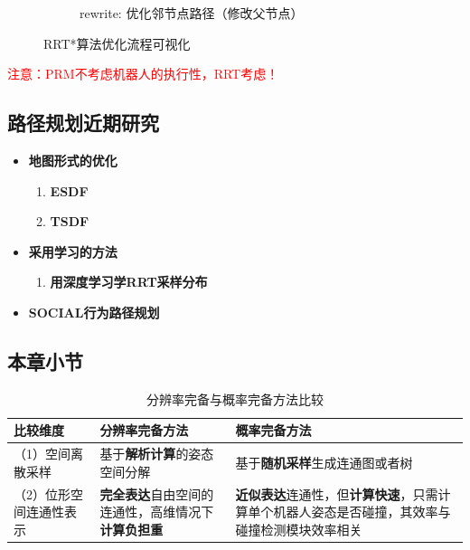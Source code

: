 \documentclass[../main.tex]{subfiles}
\begin{document}
\begin{enumerate}
\begin{figure}[H]
\begin{subfigure}[b]{0.19\textwidth}
                    \caption{rewrite: 优化邻节点路径（修改父节点）}
                    \label{fig:rrts5}
                \end{subfigure}
                \caption{RRT*算法优化流程可视化}
                \label{fig:rrts_process}
            \end{figure}
    \textcolor{red}{注意：PRM不考虑机器人的执行性，RRT考虑！}
    \end{enumerate}

\subsection{路径规划近期研究}\label{subsec:recent_research}
\begin{itemize}
    \item \textbf{地图形式的优化}\label{item:recent:map}
        \begin{enumerate}
            \item \textbf{ESDF}\label{item:recent:map:esdf}
            \item \textbf{TSDF}\label{item:recent:map:tsdf}
        \end{enumerate}
    \item \textbf{采用学习的方法}\label{item:recent:learning}
        \begin{enumerate}
            \item \textbf{用深度学习学RRT采样分布}\label{item:recent:learning:deep_rrt}
        \end{enumerate}
    \item \textbf{SOCIAL行为路径规划}\label{item:recent:social}
\end{itemize}

\subsection{本章小节}
\begin{table}[H]
    \centering
    \small
    \begin{tabular}{p{4cm}p{5.5cm}p{5.5cm}}
        \toprule
        \textbf{比较维度} & \textbf{分辨率完备方法} & \textbf{概率完备方法} \\
        \midrule
        （1）空间离散采样 & 基于\textbf{解析计算}的姿态空间分解 & 基于\textbf{随机采样}生成连通图或者树 \\
        （2）位形空间连通性表示 & \textbf{完全表达}自由空间的连通性，高维情况下\textbf{计算负担重} & \textbf{近似表达}连通性，但\textbf{计算快速}，只需计算单个机器人姿态是否碰撞，其效率与碰撞检测模块效率相关 \\
        \bottomrule
    \end{tabular}
    \caption{分辨率完备与概率完备方法比较}
    \label{tab:resolution_vs_probabilistic}
\end{table}
\end{document}
